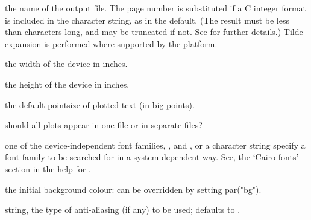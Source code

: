 \begin{Arguments}
\begin{ldescription}
\item[\code{filename}] the name of the output file.
The page number is substituted if a C integer format is included in
the character string, as in the default.  (The result must be less
than  characters long, and may be truncated if not.
See  for further details.)  Tilde expansion
is performed where supported by the platform.
\item[\code{width}] the width of the device in inches.
\item[\code{height}] the height of the device in inches.
\item[\code{pointsize}] the default pointsize of plotted text (in big points).
\item[\code{onefile}] should all plots appear in one file or in separate files?
\item[\code{family}] one of the device-independent font families,
,  and , or a character
string specify a font family to be searched for in a
system-dependent way.
See, the `Cairo fonts' section in the help for .

\item[\code{bg}] the initial background colour: can be overridden by setting
par("bg").
\item[\code{antialias}] string, the type of anti-aliasing (if any) to be used;
defaults to .
\end{ldescription}
\end{Arguments}
%
